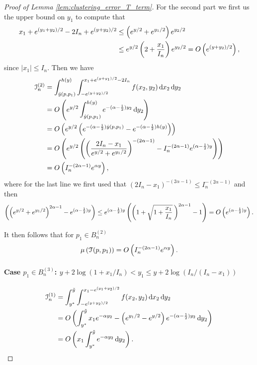 \begin{proof}[Proof of Lemma \ref{lem:clustering_error_T_term}]
For the second part we first us the upper bound on $y_1$ to compute that 
\begin{align*}
	x_1 + e^{(y_1+y_2)/2} - 2 I_n + e^{(y + y_2)/2} &\le \left(e^{y/2} + e^{y_1/2}\right)e^{y_2/2}\\
	&\le e^{y/2}\left(2 + \frac{x_1}{I_n}\right)e^{y_2/2} = O\left(e^{(y+y_2)/2}\right),
\end{align*}
since $|x_1| \le I_n$. Then we have
\begin{align*}
	\mathcal{I}_n^{(2)} &= \int_{\hat{y}(p,p_1)}^{h(y)} \int_{-e^{(y + y_2)/2}}^{x_1 + e^{(y+y_1)/2} - 2 I_n} 
		f(x_2, y_2) \operatorname{\mathrm{d}\hspace{-2pt}} x_2 \operatorname{\mathrm{d}\hspace{-2pt}} y_2\\
	&= O\left(e^{y/2} \int_{\hat{y}(p,p_1)}^{h(y)} e^{-(\alpha -\frac{1}{2}) y_2} \operatorname{\mathrm{d}\hspace{-2pt}} y_2\right)\\
	&= O\left(e^{y/2} \left(e^{-(\alpha -\frac{1}{2}) \hat{y}(p,p_1)} - e^{-(\alpha -\frac{1}{2}) h(y)}\right)\right)\\
	&= O\left(e^{y/2} \left(\left(\frac{2I_n - x_1}{e^{y/2} + e^{y_1/2}}\right)^{-(2\alpha-1)} 
		- I_n^{-(2\alpha-1)} e^{(\alpha -\frac{1}{2}) y}\right)\right)\\
	&= O\left(I_n^{-(2\alpha-1)} e^{\alpha y}\right),
\end{align*}
where for the last line we first used that $(2I_n - x_1)^{-(2\alpha-1)} \le I_n^{-(2\alpha-1)}$ and then
\[
	\left(\left(e^{y/2} + e^{y_1/2}\right)^{2\alpha-1}- e^{(\alpha -\frac{1}{2}) y}\right)
	\le e^{(\alpha -\frac{1}{2}) y}\left(\left(1 + \sqrt{1+\frac{x_1}{I_n}} \, \right)^{2\alpha - 1} - 1\right)
	= O\left(e^{(\alpha -\frac{1}{2}) y}\right).
\]

It then follows that for $p_1 \in B_n^{(2)}$
\[
	\mu\left(\mathcal{T}(p,p_1)\right) = O\left(I_n^{-(2\alpha-1)} e^{\alpha y}\right).
\]

\paragraph{Case $p_1 \in B_n^{(3)}$: $y +2\log(1+x_1/I_n) < y_1 \le y + 2\log(I_n/(I_n-x_1))$}

\begin{align*}
	\mathcal{I}_n^{(1)} &= \int_{y^\ast}^{\tilde{y}} \int_{-e^{(y+y_2)/2}}^{x_1-e^{(y_1+y_2)/2}} f(x_2,y_2)
		\operatorname{\mathrm{d}\hspace{-2pt}} x_2 \operatorname{\mathrm{d}\hspace{-2pt}} y_2\\
	&= O\left(\int_{y^\ast}^{\tilde{y}} x_1 e^{-\alpha y_2} - \left(e^{y_1/2} - e^{y/2}\right)e^{-(\alpha - \frac{1}{2})y_2}
		\operatorname{\mathrm{d}\hspace{-2pt}} y_2\right)\\
	&= O\left(x_1 \int_{y^\ast}^{\tilde{y}}  e^{-\alpha y_2} \operatorname{\mathrm{d}\hspace{-2pt}} y_2\right).
\end{align*}


\end{proof}
